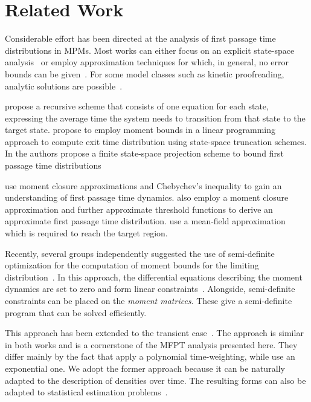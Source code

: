 \section{Related Work}\label{sec:mfpt:related}
Considerable effort has been directed at the analysis of first passage time
distributions in MPMs. Most works can either focus on an explicit state-space
analysis~\cite{barzel2008calculation,munsky2009specificity,kuntz2019exit,kuntz2018approximation}
or employ approximation techniques for which, in general, no error bounds can be
given~\cite{schnoerr2017efficient,hayden2012fluid,bortolussi2014stochastic}.
For some model classes such as kinetic proofreading, analytic solutions are
possible~\cite{munsky2009specificity,bel2009simplicity,iyer2016first}.

\citet{barzel2008calculation} propose a recursive scheme that consists of one equation for
each state, expressing the average time the system needs to transition from that
state to the target state.
\citet{kuntz2018approximation} propose to employ moment bounds in a
linear programming approach to compute exit time distribution using state-space
truncation schemes. In \citet{kuntz2019exit} the authors propose a finite state-space
projection scheme to bound first passage time distributions

\citet{hayden2012fluid} use moment closure approximations and
Chebychev's inequality to gain an understanding of first passage time dynamics.
\citet{schnoerr2017efficient} also employ a moment closure approximation
and further approximate threshold functions to derive an approximate first passage time
distribution.
\citet{bortolussi2014stochastic} use a mean-field approximation
which is required to reach the target region.

Recently, several groups independently suggested the use of semi-definite
optimization for the computation of moment bounds for the limiting
distribution~\cite{ghusinga2017exact,dowdy2018bounds,kuntz2017rigorous,sakurai2017convex}.
In this approach, the differential equations describing the moment dynamics are
set to zero and form linear constraints~\cite{backenkohler2018moment}. Alongside, semi-definite constraints can
be placed on the \emph{moment matrices}. These give a semi-definite program
that can be solved efficiently.

This approach has been extended to the transient
case~\cite{dowdy2018dynamic,sakurai2019bounding}.
The approach is similar in both works and is a cornerstone of the MFPT analysis
presented here.
They differ mainly by the fact that \citet{sakurai2019bounding} apply a polynomial
time-weighting, while \citet{dowdy2018dynamic} use an
exponential one. We adopt the former approach because it
can be naturally adapted to the description of densities over time.
The resulting forms can also be adapted to statistical estimation
problems~\cite{backenkohler2019control}.

